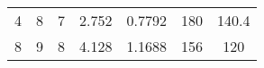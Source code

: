 \begin{table}[b]
\begin{tabular}{@{}ccccccc@{}}
4                                                            & 8                                                              & 7                                                    & 2.752                                                                            & 0.7792                                                                         & 180                                                                             & 140.4                                                                               \\
8                                                            & 9                                                              & 8                                                    & 4.128                                                                            & 1.1688                                                                         & 156                                                                             & 120                                                                                 \\ \bottomrule
\end{tabular}
\end{table}

